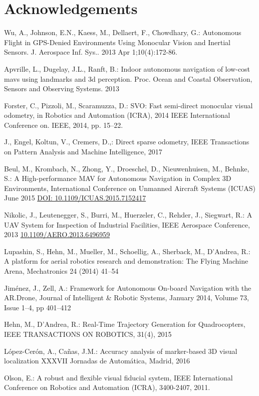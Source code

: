 \documentclass{styles/svproc}
\begin{document}
        \section*{Acknowledgements}
%
%
\begin{thebibliography}{6}
Wu, A., Johnson, E.N., Kaess, M., Dellaert, F., Chowdhary, G.: Autonomous Flight in GPS-Denied Environments Using Monocular Vision and Inertial Sensors. J. Aerospace Inf. Sys.. 2013 Apr 1;10(4):172-86.

Apvrille, L., Dugelay, J.L., Ranft, B.: Indoor autonomous navigation of low-cost mavs using landmarks and 3d perception. Proc. Ocean and Coastal Observation, Sensors and Observing Systems. 2013 

Forster, C., Pizzoli, M., Scaramuzza, D.: SVO: Fast semi-direct monocular visual odometry, in Robotics and Automation (ICRA), 2014
IEEE International Conference on. IEEE, 2014, pp. 15–22.

J., Engel, Koltun, V., Cremers, D.,: Direct sparse odometry, IEEE Transactions on Pattern Analysis and Machine Intelligence, 2017

Beul, M., Krombach, N., Zhong, Y., Droeschel, D., Nieuwenhuisen, M., Behnke, S.: A High-performance MAV for Autonomous Navigation in Complex 3D Environments, International Conference on Unmanned Aircraft Systems (ICUAS) June 2015 \url{DOI: 10.1109/ICUAS.2015.7152417}

Nikolic, J., Leutenegger, S., Burri, M., Huerzeler, C., Rehder, J., Siegwart, R.: A UAV System for Inspection of Industrial Facilities, IEEE Aerospace Conference, 2013 \url{10.1109/AERO.2013.6496959}

Lupashin, S., Hehn, M., Mueller, M., Schoellig, A., Sherback, M., D’Andrea, R.: A platform for aerial robotics research and demonstration: The Flying Machine Arena, Mechatronics 24 (2014) 41–54

Jiménez, J., Zell, A.: Framework for Autonomous On-board Navigation with the AR.Drone, Journal of Intelligent \& Robotic Systems, January 2014, Volume 73, Issue 1–4, pp 401–412

Hehn, M., D'Andrea, R.: Real-Time Trajectory Generation for Quadrocopters, IEEE TRANSACTIONS ON ROBOTICS,  31(4), 2015

López-Cerón, A., Cañas, J.M.: Accuracy analysis of marker-based 3D visual localization
 XXXVII Jornadas de Automática, Madrid, 2016 %

Olson, E.: A robust and flexible visual fiducial system, IEEE International Conference on Robotics and Automation (ICRA), 3400-2407, 2011.

\end{thebibliography}

        
\end{document}
